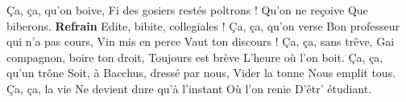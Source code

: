 \footnotemark 
[ititle={Ca, ça, qu'on boive},tu={Edite, bibite, collegiales !}]

\beginverse
Ça, ça, qu'on boive,
Fi des gosiers restés poltrons !
Qu'on ne reçoive
Que biberons.
\endverse
\beginchorus
\textbf{Refrain}
Edite, bibite, collegiales !
\endverse
\beginverse
Ça, ça, qu'on verse
Bon professeur qui n'a pas cours,
Vin mis en perce
Vaut ton discours !
\endverse
\beginverse
Ça, ça, sans trêve,
Gai compagnon, boire ton droit,
Toujours est brève
L'heure où l'on boit.
\endverse
\beginverse
Ça, ça, qu'un trône
Soit, à Bacchus, dressé par nous,
Vider la tonne
Nous emplit tous.
\endverse
\beginverse
Ça, ça, la vie
Ne devient dure qu'à l'instant
Où l'on renie
D'êtr' étudiant.
\endverse
\endsong
